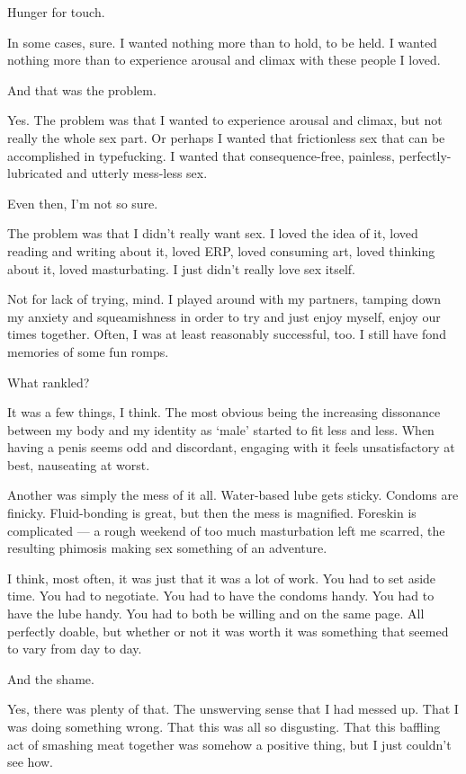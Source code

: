 \begin{paracol}{2}
\begin{leftcolumn}
\begin{ally}
Hunger for touch.
\end{ally}
In some cases, sure. I wanted nothing more than to hold, to be held. I wanted nothing more than to experience arousal and climax with these people I loved.

\begin{ally}
And that was the problem.
\end{ally}
Yes. The problem was that I wanted to experience arousal and climax, but not really the whole sex part. Or perhaps I wanted that frictionless sex that can be accomplished in typefucking. I wanted that consequence-free, painless, perfectly-lubricated and utterly mess-less sex.

Even then, I'm not so sure.
\newpage

\noindent The problem was that I didn't really want sex. I loved the idea of it, loved reading and writing about it, loved ERP, loved consuming art, loved thinking about it, loved masturbating. I just didn't really love sex itself.

Not for lack of trying, mind. I played around with my partners, tamping down my anxiety and squeamishness in order to try and just enjoy myself, enjoy our times together. Often, I was at least reasonably successful, too. I still have fond memories of some fun romps.

\begin{ally}
What rankled?
\end{ally}
It was a few things, I think. The most obvious being the increasing dissonance between my body and my identity as `male' started to fit less and less. When having a penis seems odd and discordant, engaging with it feels unsatisfactory at best, nauseating at worst.

Another was simply the mess of it all. Water-based lube gets sticky. Condoms are finicky. Fluid-bonding is great, but then the mess is magnified. Foreskin is complicated --- a rough weekend of too much masturbation left me scarred, the resulting phimosis making sex something of an adventure.

I think, most often, it was just that it was a lot of work. You had to set aside time. You had to negotiate. You had to have the condoms handy. You had to have the lube handy. You had to both be willing and on the same page. All perfectly doable, but whether or not it was worth it was something that seemed to vary from day to day.

\begin{ally}
And the shame.
\end{ally}
Yes, there was plenty of that. The unswerving sense that I had messed up. That I was doing something wrong. That this was all so disgusting. That this baffling act of smashing meat together was somehow a positive thing, but I just couldn't see how.


\end{leftcolumn}
\end{paracol}
